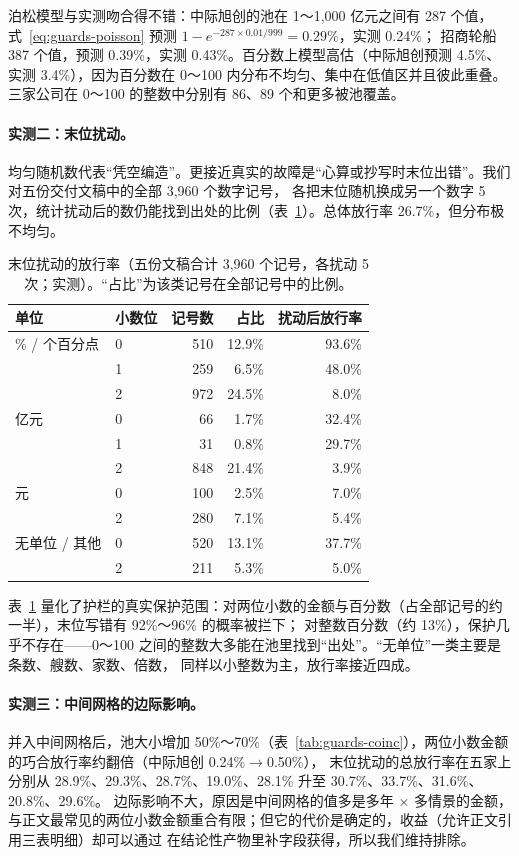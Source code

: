 泊松模型与实测吻合得不错：中际旭创的池在 1～1,000 亿元之间有 287 个值，式~\eqref{eq:guards-poisson} 预测 $1-e^{-287\times0.01/999}=0.29\%$，实测 0.24\%；
招商轮船 387 个值，预测 0.39\%，实测 0.43\%。百分数上模型高估（中际旭创预测 4.5\%、实测 3.4\%），因为百分数在 0～100 内分布不均匀、集中在低值区并且彼此重叠。
三家公司在 0～100 的整数中分别有 86、89 个和更多被池覆盖。

\paragraph{实测二：末位扰动。}均匀随机数代表“凭空编造”。更接近真实的故障是“心算或抄写时末位出错”。我们对五份交付文稿中的全部 3,960 个数字记号，
各把末位随机换成另一个数字 5 次，统计扰动后的数仍能找到出处的比例（表~\ref{tab:guards-perturb}）。总体放行率 26.7\%，但分布极不均匀。

\begin{table}[t]
\centering
\caption{末位扰动的放行率（五份文稿合计 3,960 个记号，各扰动 5 次；实测）。“占比”为该类记号在全部记号中的比例。}
\label{tab:guards-perturb}
\small
\begin{tabular}{@{}llrrr@{}}
\toprule
单位 & 小数位 & 记号数 & 占比 & 扰动后放行率 \\
\midrule
\% / 个百分点 & 0 & 510 & 12.9\% & 93.6\% \\
              & 1 & 259 & 6.5\% & 48.0\% \\
              & 2 & 972 & 24.5\% & 8.0\% \\
亿元 & 0 & 66 & 1.7\% & 32.4\% \\
     & 1 & 31 & 0.8\% & 29.7\% \\
     & 2 & 848 & 21.4\% & 3.9\% \\
元 & 0 & 100 & 2.5\% & 7.0\% \\
   & 2 & 280 & 7.1\% & 5.4\% \\
无单位 / 其他 & 0 & 520 & 13.1\% & 37.7\% \\
              & 2 & 211 & 5.3\% & 5.0\% \\
\bottomrule
\end{tabular}
\end{table}

表~\ref{tab:guards-perturb} 量化了护栏的真实保护范围：对两位小数的金额与百分数（占全部记号的约一半），末位写错有 92\%～96\% 的概率被拦下；
对整数百分数（约 13\%），保护几乎不存在——0～100 之间的整数大多能在池里找到“出处”。“无单位”一类主要是条数、艘数、家数、倍数，
同样以小整数为主，放行率接近四成。

\paragraph{实测三：中间网格的边际影响。}并入中间网格后，池大小增加 50\%～70\%（表~\ref{tab:guards-coinc}），两位小数金额的巧合放行率约翻倍（中际旭创 0.24\%$\to$0.50\%），
末位扰动的总放行率在五家上分别从 28.9\%、29.3\%、28.7\%、19.0\%、28.1\% 升至 30.7\%、33.7\%、31.6\%、20.8\%、29.6\%。
边际影响不大，原因是中间网格的值多是多年 × 多情景的金额，与正文最常见的两位小数金额重合有限；但它的代价是确定的，收益（允许正文引用三表明细）却可以通过
在结论性产物里补字段获得，所以我们维持排除。


